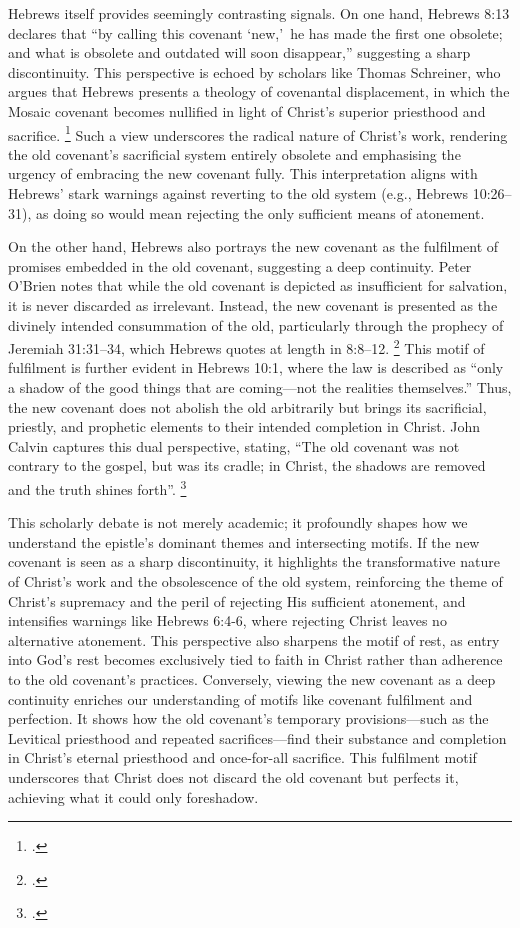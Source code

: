 \documentclass[12pt]{article}
\def\christ{the Messiah}
\def\christ{Christ}
\begin{document}
Hebrews itself provides seemingly contrasting signals. On one hand, Hebrews 8:13
declares that ``by calling this covenant \lq{}new,\rq\ he has made the first one
obsolete; and what is obsolete and outdated will soon disappear,'' suggesting a
sharp discontinuity.
%
This perspective is echoed by scholars like Thomas Schreiner, who argues that
Hebrews presents a theology of covenantal displacement, in which the Mosaic
covenant becomes nullified in light of \christ{}’s superior priesthood and
sacrifice. \footcite[204]{Schreiner2017}
%
Such a view underscores the radical nature of \christ{}’s work, rendering the
old covenant’s sacrificial system entirely obsolete and emphasising the urgency
of embracing the new covenant fully.
%
This interpretation aligns with Hebrews’ stark warnings against reverting to the
old system (e.g., Hebrews 10:26--31), as doing so would mean rejecting the only
sufficient means of atonement.

On the other hand, Hebrews also portrays the new covenant as the fulfilment of
promises embedded in the old covenant, suggesting a deep continuity. Peter
O’Brien notes that while the old covenant is depicted as insufficient for
salvation, it is never discarded as irrelevant. Instead, the new covenant is
presented as the divinely intended consummation of the old, particularly through
the prophecy of Jeremiah 31:31--34, which Hebrews quotes at length in 8:8--12.
\footcite[296]{OBrien2010}
This motif of fulfilment is further evident in Hebrews
10:1, where the law is described as ``only a shadow of the good things that are
coming---not the realities themselves.'' Thus, the new covenant does not abolish
the old arbitrarily but brings its sacrificial, priestly, and prophetic elements
to their intended completion in \christ{}. John Calvin captures this dual
perspective, stating, ``The old covenant was not contrary to the gospel, but was
its cradle; in \christ{}, the shadows are removed and the truth shines forth''.
\footcite[45]{Calvin1853}

This scholarly debate is not merely academic; it profoundly shapes how we
understand the epistle’s dominant themes and intersecting motifs.
%
If the new covenant is seen as a sharp discontinuity, it highlights the
transformative nature of \christ{}’s work and the obsolescence of the old
system, reinforcing the theme of \christ{}’s supremacy and the peril of
rejecting His sufficient atonement, and intensifies warnings like Hebrews 6:4-6,
where rejecting \christ{} leaves no alternative atonement.
%
This perspective also sharpens the motif of rest, as entry into God’s rest
becomes exclusively tied to faith in \christ{} rather than adherence to the old
covenant’s practices.
%
Conversely, viewing the new covenant as a deep continuity enriches our
understanding of motifs like covenant fulfilment and perfection.
%
It shows how the old covenant’s temporary provisions—such as the Levitical
priesthood and repeated sacrifices—find their substance and completion in
\christ{}’s eternal priesthood and once-for-all sacrifice.
%
This fulfilment motif underscores that \christ{} does not discard the old
covenant but perfects it, achieving what it could only foreshadow.
\end{document}
